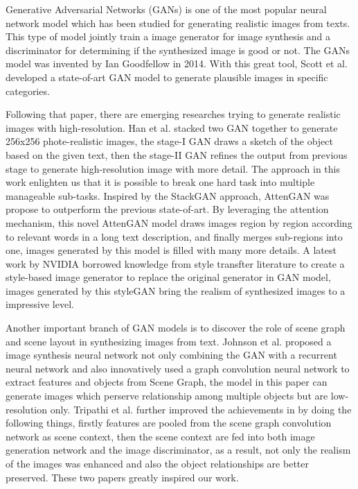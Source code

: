 \documentclass{article}
\begin{document}
Generative Adversarial Networks (GANs) is one of the most popular neural network model which has been studied for generating realistic images from texts. This type of model jointly train a image generator for image synthesis and a discriminator for determining if the synthesized image is good or not. The GANs model was invented by Ian Goodfellow \cite{gan} in 2014. With this great tool,  Scott et al. \cite{t2im} developed a state-of-art GAN model to generate plausible images in specific categories. 

Following that paper, there are emerging researches trying to generate realistic images with high-resolution. Han et al. \cite{stackedgan} stacked two GAN together to generate 256x256 phote-realistic images, the stage-I GAN draws a sketch of the object based on the given text, then the stage-II GAN refines the output from previous stage to generate high-resolution image with more detail. The approach in this work enlighten us that it is possible to break one hard task into multiple manageable sub-tasks. Inspired by the StackGAN approach, AttenGAN \cite{attengan} was propose to outperform the previous state-of-art. By leveraging the attention mechanism, this novel AttenGAN model draws images region by region according to relevant words in a long text description, and finally merges sub-regions into one, images generated by this model is filled with many more details. A latest work by NVIDIA \cite{stylegan} borrowed knowledge from style transfter literature to create a style-based image generator to replace the original generator in GAN model, images generated by this styleGAN bring the realism of synthesized images to a impressive level.

Another important branch of GAN models is to discover the role of scene graph and scene layout in synthesizing images from text. Johnson et al.\cite{sg2im} proposed a image synthesis neural network not only combining the GAN with a recurrent neural network and also innovatively used a graph convolution neural network to extract features and objects from Scene Graph, the model in this paper can generate images which perserve relationship among multiple objects but are low-resolution only. Tripathi et al. \cite{sg2imgcontext} further improved the achievements in \cite{sg2im} by doing the following things, firstly features are pooled from the scene graph convolution network as scene context, then the scene context are fed into both image generation network and the image discriminator, as a result, not only the realism of the images was enhanced and also the object relationships are better preserved. These two papers greatly inspired our work.
\end{document}
